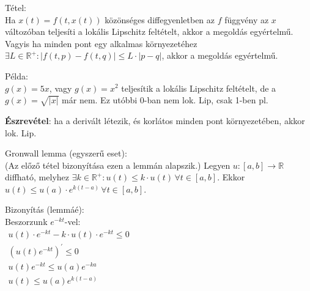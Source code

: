 \documentclass[12pt,a4paper]{scrartcl}
\newenvironment{tetel}{}{}
\newenvironment{bizonyitas}{}{}
\newenvironment{pelda}{}{}
\begin{document}
\begin{tetel}

Tétel:\\
Ha
\(\overset{}{x}\left( t \right) = f\left( {t,x\left( t \right)} \right)\)
közönséges diffegyenletben az \(f\) függvény az \(x\) változóban
teljesíti a lokális Lipschitz feltételt, akkor a megoldás egyértelmű.
Vagyis ha minden pont egy alkalmas környezetéhez
\(\exists L \in {\mathbb{R}}^{+}:\left| {f\left( {t,p} \right) - f\left( {t,q} \right)} \right| \leq L \cdot \left| {p - q} \right|\),
akkor a megoldás egyértelmű.

\end{tetel}

\begin{pelda}

Példa:\\
\(g\left( x \right) = 5x\), vagy \(g\left( x \right) = x^{2}\)
teljesítik a lokális Lipschitz feltételt, de a
\(g\left( x \right) = \sqrt{\left| x \right|}\) már nem. Ez utóbbi 0-ban
nem lok. Lip, csak 1-ben pl.

\end{pelda}

\textbf{Észrevétel}: ha a derivált létezik, és korlátos minden pont
környezetében, akkor lok. Lip.

\begin{tetel}

Gronwall lemma (egyszerű eset):\\
(Az előző tétel bizonyítása ezen a lemmán alapszik.) Legyen
\(\left. u:\left\lbrack {a,b} \right\rbrack\rightarrow{\mathbb{R}} \right.\)
diffható, melyhez
\(\exists k \in {\mathbb{R}}^{+}:\overset{}{u}\left( t \right) \leq k \cdot u\left( t \right)\,\forall t \in \left\lbrack {a,b} \right\rbrack\).
Ekkor
\(u\left( t \right) \leq u\left( a \right) \cdot e^{k{({t - a})}}\,\forall t \in \left\lbrack {a,b} \right\rbrack\).

\end{tetel}

\begin{bizonyitas}

Bizonyítás (lemmáé):\\
Beszorzunk \(e^{- kt}\)-vel:\\
\(\begin{array}{l} {\overset{}{u}\left( t \right) \cdot e^{- kt} - k \cdot u\left( t \right) \cdot e^{- kt} \leq 0} \\ {\left( {u\left( t \right)e^{- kt}} \right)^{\prime} \leq 0} \\ {u\left( t \right)e^{- kt} \leq u\left( a \right)e^{- ka}} \\ {u\left( t \right) \leq u\left( a \right)e^{k{({t - a})}}} \\ \end{array}\)

\end{bizonyitas}
\end{document}
